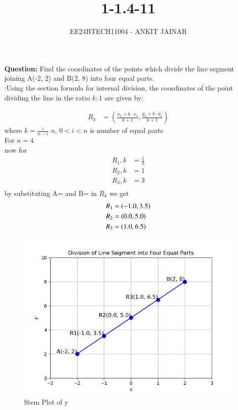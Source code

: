 \documentclass[journal]{IEEEtran}
\begin{document}

\vspace{3cm}


\title{1-1.4-11}
\author{EE24BTECH11004 - ANKIT JAINAR
}
{\let\newpage\relax\maketitle}

\renewcommand{\thefigure}{\theenumi}
\renewcommand{\thetable}{\theenumi}
\setlength{\intextsep}{10pt} %


\renewcommand{\thetable}{\theenumi}

\textbf{Question:} Find the coordinates of the points which divide the line segment joining A(-2, 2) and B(2, 8) into four equal parts.\\
\solution:Using the section formula for internal division, the coordinates of the point dividing the line in the ratio $k:1$ are given by:

\begin{align}
R_k &= \left( \frac{x_2  + k \cdot x_1}{k+1}, \frac{ y_2 + k \cdot y_1}{k+1} \right)
\end{align} 
where $k = \frac{i}{n-i}$ $n$, $0<i<n$ is number of equal parts \\
For $n = 4$ \\
now for
\begin{align}
R_1,k&=\frac{1}{3}\\
R_2,k&=1\\
R_3,k&=3\\
\end{align}
by substituting A= and B= in $R_k$
we get \\
\begin{align}
   R_1&=\left(-1.0,3.5\right)\\
   R_2&=\left(0.0,5.0\right)\\
   R_3&=\left(1.0,6.5\right)\\
\end{align}	

\begin{figure}
    \centering
    \includegraphics[width=0.5\linewidth]{figs/Figure_1.png}
    \caption{Stem Plot of y}
    \label{stemplot}
\end{figure}
\end{document}
